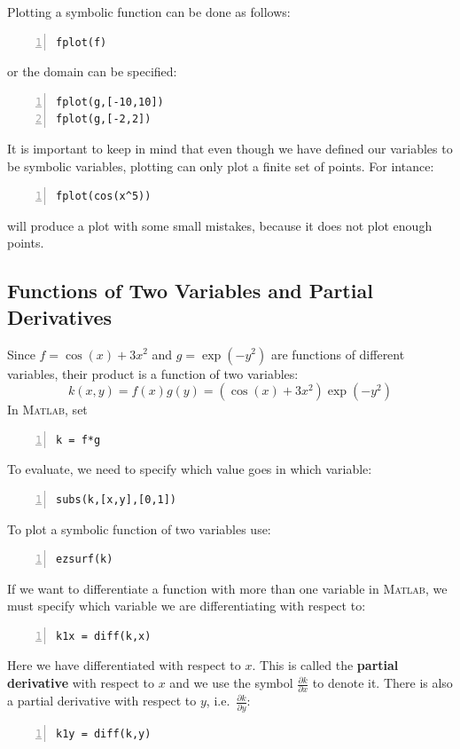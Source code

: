 Plotting a symbolic function can be done as follows:
\begin{lstlisting}[frame=none,numbers=left]
fplot(f)
\end{lstlisting}
or the domain can be specified:
\begin{lstlisting}[frame=none,numbers=left]
fplot(g,[-10,10])
fplot(g,[-2,2])
\end{lstlisting}
It is important to keep in mind that even though we have defined our
variables to be symbolic variables, plotting can only plot
a finite set of points. For intance:
\begin{lstlisting}[frame=none,numbers=left]
fplot(cos(x^5))
\end{lstlisting}
will produce a plot with some small mistakes, because it does not plot enough points.
%
%

\newpage

\subsection*{Functions of Two Variables and Partial Derivatives}

Since $f = \cos(x) + 3x^2$ and $g = \exp(-y^2)$ are functions of different variables,
their product is a function of two variables:
$$
k(x,y) = f(x) g(y) = ( \cos(x) + 3 x^2) \exp(-y^2)
$$
In \textsc{Matlab}, set
\begin{lstlisting}[frame=none,numbers=left]
k = f*g
\end{lstlisting}
To evaluate, we need to specify which value goes in which variable:
\begin{lstlisting}[frame=none,numbers=left]
subs(k,[x,y],[0,1])
\end{lstlisting}
To plot a symbolic function of two variables use:
\begin{lstlisting}[frame=none,numbers=left]
ezsurf(k)
\end{lstlisting}


If we want to differentiate a function with more than one variable in \textsc{Matlab}, we
must specify which variable we are differentiating with respect to:
\begin{lstlisting}[frame=none,numbers=left]
k1x = diff(k,x)
\end{lstlisting}
Here we have differentiated with respect to $x$. This is called the {\bf partial derivative} with respect to $x$ and
we use the symbol ${\displaystyle \frac{\partial k}{\partial x}}$ to denote it.
There is also a partial derivative with respect to $y$, i.e.\ ${\displaystyle \frac{\partial k}{\partial y}}$:
\begin{lstlisting}[frame=none,numbers=left]
k1y = diff(k,y)
\end{lstlisting}


